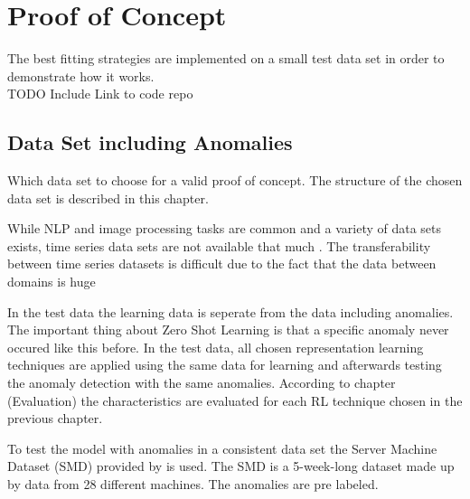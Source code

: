 \section{Proof of Concept}\label{implementation}
The best fitting strategies are implemented on a small test data set in order to demonstrate how it works.\\
TODO Include Link to code repo
\subsection{Data Set including Anomalies}
Which data set to choose for a valid proof of concept. The structure of the chosen data set is described in this chapter.

While NLP and image processing tasks are common and a variety of data sets exists, time series data sets are not available that much \cite{ma_survey_2023}. The transferability between time series datasets is difficult due to the fact that the data between domains is huge \cite{ma_survey_2023}

In the test data the learning data is seperate from the data including anomalies. The important thing about Zero Shot Learning is that a specific anomaly never occured like this before. In the test data, all chosen representation learning techniques are applied using the same data for learning and afterwards testing the anomaly detection with the same anomalies. According to chapter (Evaluation) the characteristics are evaluated for each RL technique chosen in the previous chapter.

To test the model with anomalies in a consistent data set the Server Machine Dataset (SMD) provided by  is used. The SMD is a 5-week-long dataset made up by data from 28 different machines. The anomalies are pre labeled.

